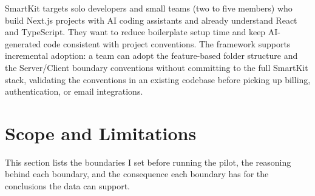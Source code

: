 \documentclass[12pt,a4paper]{report}
\begin{document}
SmartKit targets solo developers and small teams (two to five members) who build Next.js projects with AI coding assistants and already understand React and TypeScript. They want to reduce boilerplate setup time and keep AI-generated code consistent with project conventions. The framework supports incremental adoption: a team can adopt the feature-based folder structure and the Server/Client boundary conventions without committing to the full SmartKit stack, validating the conventions in an existing codebase before picking up billing, authentication, or email integrations.

\section{Scope and Limitations}
\label{sec:scope-limitations}

This section lists the boundaries I set before running the
pilot, the reasoning behind each boundary, and the consequence each
boundary has for the conclusions the data can support.
\end{document}
